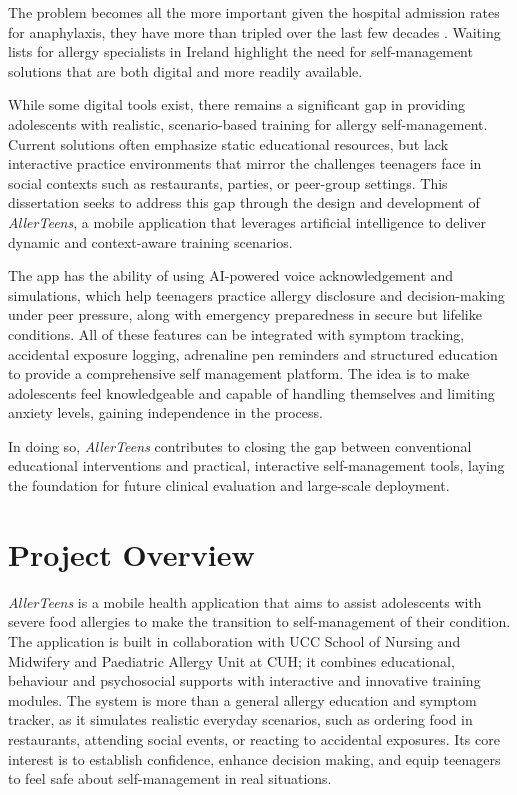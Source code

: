 \documentclass[MScCS]{uccthesis}
\begin{document}
The problem becomes all the more important given the hospital admission rates for anaphylaxis, they have more than tripled over the last few decades \cite{matricardi2020mhealth}. Waiting lists for allergy specialists in Ireland highlight the need for self-management solutions that are both digital and more readily available.  

While some digital tools exist, there remains a significant gap in providing adolescents with realistic, scenario-based training for allergy self-management. Current solutions often emphasize static educational resources, but lack interactive practice environments that mirror the challenges teenagers face in social contexts such as restaurants, parties, or peer-group settings. This dissertation seeks to address this gap through the design and development of \textit{AllerTeens}, a mobile application that leverages artificial intelligence to deliver dynamic and context-aware training scenarios.  
 
The app has the ability of using AI-powered voice acknowledgement and simulations, which help teenagers practice allergy disclosure and decision-making under peer pressure, along with emergency preparedness in secure but lifelike conditions. All of these features can be integrated with symptom tracking, accidental exposure logging, adrenaline pen reminders and structured education to provide a comprehensive self management platform. The idea is to make adolescents feel knowledgeable and capable of handling themselves and limiting anxiety levels, gaining independence in the process.

In doing so, \textit{AllerTeens} contributes to closing the gap between conventional educational interventions and practical, interactive self-management tools, laying the foundation for future clinical evaluation and large-scale deployment.  
\clearpage




\section{Project Overview}
\textit{AllerTeens} is a mobile health application that aims to assist adolescents with severe food allergies to make the transition to self-management of their condition. The application is built in collaboration with UCC School of Nursing and Midwifery and Paediatric Allergy Unit at CUH; it combines educational, behaviour and psychosocial supports with interactive and innovative training modules. The system is more than a general allergy education and symptom tracker, as it simulates realistic everyday scenarios, such as ordering food in restaurants, attending social events, or reacting to accidental exposures. Its core interest is to establish confidence, enhance decision making, and equip teenagers to feel safe about self-management in real situations.  
\end{document}
